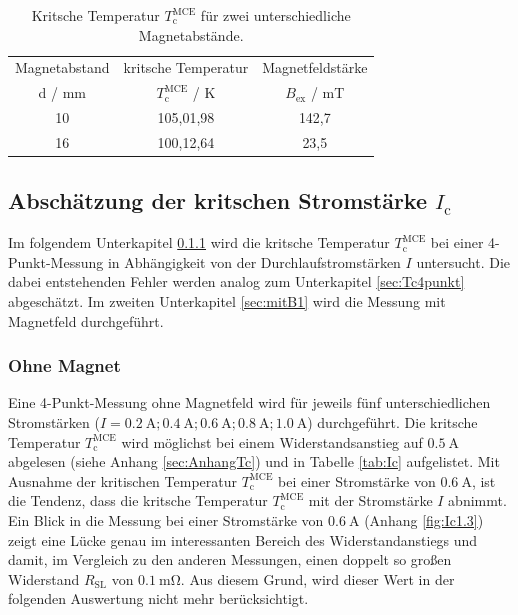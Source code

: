 \begin{table}
  \centering
  \caption{Kritsche Temperatur $T^{\text{MCE}}_{\text{c}}$ für zwei
	unterschiedliche Magnetabstände.}
  \label{tab:Tc4PM1016}
  \begin{tabular}{S | S S}
    \toprule
    {Magnetabstand} & {kritsche Temperatur} & {Magnetfeldstärke} \\
    {d / mm} & {$T^{\text{MCE}}_{\text{c}}$ / K } & {$B_{\text{ex}}$ / mT} \\
    \midrule
    {10} & {105,01,98}	&	{142,7}	\\
		{16} & {100,12,64}	&	{23,5}	\\
    \bottomrule
  \end{tabular}
\end{table}

\subsection{Abschätzung der kritschen Stromstärke $I_{\text{c}}$}
\label{sec:Ic}
Im folgendem Unterkapitel \ref{sec:ohneB1} wird die kritsche Temperatur
$T^{\text{MCE}}_{\text{c}}$ bei einer 4-Punkt-Messung in Abhängigkeit von der
Durchlaufstromstärken $I$ untersucht. Die dabei entstehenden Fehler werden analog
zum Unterkapitel \ref{sec:Tc4punkt} abgeschätzt. Im zweiten Unterkapitel
\ref{sec:mitB1} wird die Messung mit Magnetfeld durchgeführt.

\subsubsection{Ohne Magnet}
\label{sec:ohneB1}
Eine 4-Punkt-Messung ohne Magnetfeld wird für jeweils fünf unterschiedlichen
Stromstärken ($I=\SI{0,2}{\ampere}; \SI{0,4}{\ampere}; \SI{0,6}{\ampere};
\SI{0,8}{\ampere}; \SI{1,0}{\ampere}$) durchgeführt. Die kritsche Temperatur
$T^{\text{MCE}}_{\text{c}}$ wird möglichst bei einem Widerstandsanstieg auf
$\SI{0.5}{\ampere}$ abgelesen (siehe Anhang \ref{sec:AnhangTc}) und
in Tabelle \ref{tab:Ic} aufgelistet. Mit Ausnahme
der kritischen Temperatur $T^{\text{MCE}}_{\text{c}}$ bei einer Stromstärke von
$\SI{0.6}{\ampere}$, ist die Tendenz, dass die kritsche Temperatur
$T^{\text{MCE}}_{\text{c}}$ mit der Stromstärke $I$ abnimmt. Ein Blick in die Messung
bei einer Stromstärke von $\SI{0,6}{\ampere}$ (Anhang \ref{fig:Ic1.3}) zeigt
eine Lücke genau im interessanten Bereich des Widerstandanstiegs
und damit, im Vergleich zu den anderen Messungen, einen doppelt so großen
Widerstand $R_{\text{SL}}$ von $\SI{0.1}{\milli\ohm}$. Aus diesem Grund, wird dieser
Wert in der folgenden Auswertung nicht mehr berücksichtigt.

